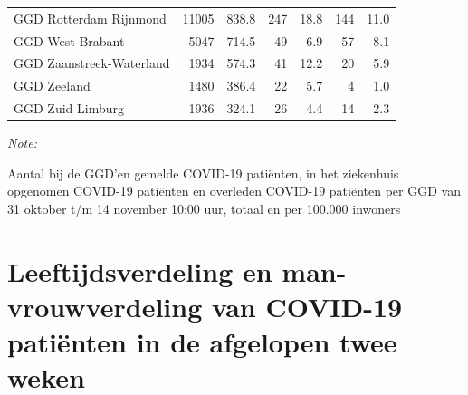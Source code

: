\documentclass[
  english,
  man,floatsintext]{apa6}
\begin{document}
\begin{table}[H]
\begin{threeparttable}
\begin{tabular}{lrrrrrr}
GGD Rotterdam Rijnmond & 11005 & 838.8 & 247 & 18.8 & 144 & 11.0\\
GGD West Brabant & 5047 & 714.5 & 49 & 6.9 & 57 & 8.1\\
GGD Zaanstreek-Waterland & 1934 & 574.3 & 41 & 12.2 & 20 & 5.9\\
GGD Zeeland & 1480 & 386.4 & 22 & 5.7 & 4 & 1.0\\
GGD Zuid Limburg & 1936 & 324.1 & 26 & 4.4 & 14 & 2.3\\
\bottomrule
\end{tabular}
\begin{tablenotes}
\item \textit{Note: } 
\item Aantal bij de GGD’en gemelde COVID-19 patiënten, in het ziekenhuis opgenomen COVID-19 patiënten en overleden COVID-19 patiënten per GGD van 31 oktober t/m 14 november 10:00 uur, totaal en per 100.000 inwoners
\end{tablenotes}
\end{threeparttable}
\endgroup{}
\end{table}

\newpage

\hypertarget{leeftijdsverdeling-en-man-vrouwverdeling-van-covid-19-patiuxebnten-in-de-afgelopen-twee-weken}{%
\section{Leeftijdsverdeling en man-vrouwverdeling van COVID-19 patiënten in de afgelopen twee weken}\label{leeftijdsverdeling-en-man-vrouwverdeling-van-covid-19-patiuxebnten-in-de-afgelopen-twee-weken}}
\end{document}
